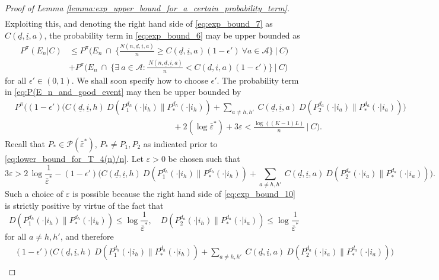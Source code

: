 \begin{proof}[Proof of Lemma \ref{lemma:exp_upper_bound_for_a_certain_probability_term}]
\begin{align}
\end{align}
Exploiting this, and denoting the right hand side of \eqref{eq:exp_bound_7} as $C(\underline{d}, \underline{i}, a)$, the probability term in \eqref{eq:exp_bound_6} may be upper bounded as
\begin{align}
	P^\pi(E_n|C)&\leq P^\pi\bigg(E_n~\cap~\bigg\lbrace\frac{N(n, \underline{d}, \underline{i}, a)}{n}\geq C(\underline{d}, \underline{i}, a)(1-\epsilon')~ \forall a\in \mathcal{A}\bigg\rbrace~\bigg|~C\bigg)\label{eq:P(E_n_and_good_event}\\
	& + P^\pi\bigg(E_n~\cap~\bigg\lbrace\exists~a\in \mathcal{A}:\frac{~N(n, \underline{d}, \underline{i}, a)}{n}< C(\underline{d}, \underline{i}, a)(1-\epsilon')\bigg\rbrace~\bigg|~C\bigg)
	\label{eq:exp_bound_8}
\end{align}
for all $\epsilon'\in (0, 1)$. We shall soon specify how to choose $\epsilon'$.
The probability term in \eqref{eq:P(E_n_and_good_event} may then be upper bounded by
\begin{align}
	& P^\pi\bigg((1-\epsilon')\bigg(C(\underline{d}, \underline{i}, h)~D(P_1^{d_h}(\cdot|i_h)\|P_*^{d_h}(\cdot|i_h))+\sum\limits_{a\neq h, h'}~C(\underline{d}, \underline{i}, a)~D(P_2^{d_a}(\cdot|i_a)\|P_*^{d_a}(\cdot|i_a))\bigg)\nonumber\\
	&\hspace{8cm}+2(\log \bar{\varepsilon}^*)+3\varepsilon<\frac{\log((K-1)L)}{n}~\bigg|~C\bigg).
	\label{eq:exp_bound_9}
\end{align}
Recall that $P_*\in \mathscr{P}(\bar{\varepsilon}^*)$, $P_*\neq P_1, P_2$ as indicated prior to \eqref{eq:lower_bound_for_T_4(n)/n}. Let $\varepsilon>0$ be chosen such that
\begin{equation}
	3\varepsilon>2\,\log\frac{1}{\bar{\varepsilon}^*}-(1-\epsilon')\bigg(C(\underline{d}, \underline{i}, h)~D(P_1^{d_h}(\cdot|i_h)\|P_*^{d_h}(\cdot|i_h))+\sum\limits_{a\neq h, h'}~C(\underline{d}, \underline{i}, a)~D(P_2^{d_a}(\cdot|i_a)\|P_*^{d_a}(\cdot|i_a))\bigg).
	\label{eq:exp_bound_10}
\end{equation}
Such a choice of $\varepsilon$ is possible because the right hand side of \eqref{eq:exp_bound_10} is strictly positive by virtue of the fact that $$D(P_1^{d_h}(\cdot|i_h)\|P_*^{d_h}(\cdot|i_h))\leq \log \frac{1}{\bar{\varepsilon}^*}, \quad  D(P_2^{d_a}(\cdot|i_h)\|P_*^{d_a}(\cdot|i_a))\leq \log \frac{1}{\bar{\varepsilon}^*}$$ for all $a\neq h, h'$, and therefore
\begin{align}
	&(1-\epsilon')\bigg(C(\underline{d}, \underline{i}, h)~D(P_1^{d_h}(\cdot|i_h)\|P_*^{d_h}(\cdot|i_h))+\sum\limits_{a\neq h, h'}~C(\underline{d}, \underline{i}, a)~D(P_2^{d_a}(\cdot|i_a)\|P_*^{d_a}(\cdot|i_a))\bigg) \nonumber\\

\end{align}
\end{proof}
